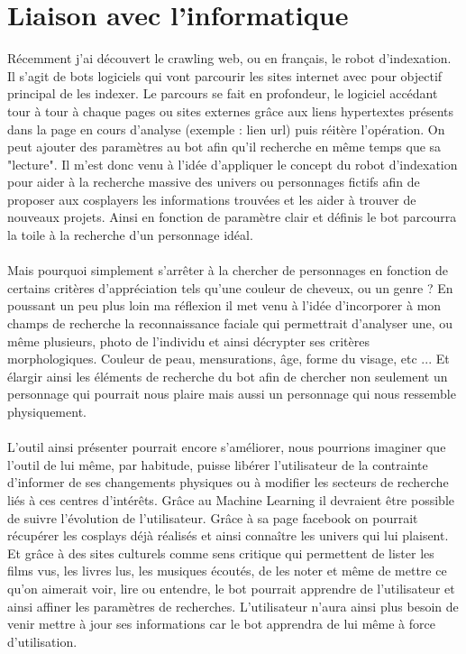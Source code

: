 \documentclass[a4paper,12pt]{article}
\begin{document}
\section{Liaison avec l'informatique}
Récemment j'ai découvert le crawling web, ou en français, le robot d'indexation. Il s'agit de bots logiciels qui vont parcourir les sites internet avec pour objectif principal de les indexer. Le parcours se fait en profondeur, le logiciel accédant tour à tour à chaque pages ou sites externes grâce aux liens hypertextes présents dans la page en cours d'analyse (exemple : lien url) puis réitère l'opération. On peut ajouter des paramètres au bot afin qu'il recherche en même temps que sa "lecture". Il m'est donc venu à l'idée d'appliquer le concept du robot d'indexation pour aider à la recherche massive des univers ou personnages fictifs afin de proposer aux cosplayers les informations trouvées et les aider à trouver de nouveaux projets. Ainsi en fonction de paramètre clair et définis le bot parcourra la toile à la recherche d'un personnage idéal. 
\\ \\
Mais pourquoi simplement s'arrêter à la chercher de personnages en fonction de certains critères d'appréciation tels qu'une couleur de cheveux, ou un genre ? En poussant un peu plus loin ma réflexion il met venu à l'idée d'incorporer à mon champs de recherche la reconnaissance faciale qui permettrait d'analyser une, ou même plusieurs, photo de l'individu et ainsi décrypter ses critères morphologiques. Couleur de peau, mensurations, âge, forme du visage,  etc ... Et élargir ainsi les éléments de recherche du bot afin de chercher non seulement un personnage qui pourrait nous plaire mais aussi un personnage qui nous ressemble physiquement.  
\\ \\ 
L'outil ainsi présenter pourrait encore s'améliorer, nous pourrions imaginer que l'outil de lui même, par habitude, puisse libérer l'utilisateur de la contrainte d'informer de ses changements physiques ou à modifier les secteurs de recherche liés à ces centres d'intérêts. Grâce au Machine Learning il devraient être possible de suivre l'évolution de l'utilisateur. Grâce à sa page facebook on pourrait récupérer les cosplays déjà réalisés et ainsi connaître les univers qui lui plaisent. Et grâce à des sites culturels comme sens critique qui permettent de lister les films vus, les livres lus, les musiques écoutés, de les noter et même de mettre ce qu'on aimerait voir, lire ou entendre, le bot pourrait apprendre de l'utilisateur et ainsi affiner les paramètres de recherches. L'utilisateur n'aura ainsi plus besoin de venir mettre à jour ses informations car le bot apprendra de lui même à force d'utilisation. 
\end{document}

